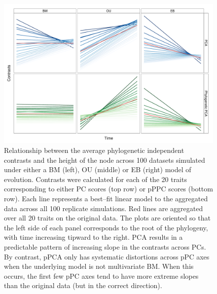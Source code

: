 \documentclass[a4paper,12pt]{article}
\begin{document}
\begin{figure}[p]
\centering
\includegraphics[scale=0.65]{./fig/nh-2panel.pdf}
\caption{Relationship between the average phylogenetic independent contrasts and the height of the node across 100 datasets simulated under either a BM (left), OU (middle) or EB (right) model of evolution. Contrasts were calculated for each of the 20 traits corresponding to either PC scores (top row) or pPPC scores (bottom row). Each line represents a best--fit linear model to the aggregated data across all 100 replicate simulations. Red lines are aggregated over all 20 traits on the original data. The plots are oriented so that the left side of each panel corresponds to the root of the phylogeny, with time increasing tipward to the right. PCA results in a predictable pattern of increasing slope in the contrasts across PCs. By contrast, pPCA only has systematic distortions across pPC axes when the underlying model is not multivariate BM. When this occurs, the first few pPC axes tend to have more extreme slopes than the original data (but in the correct direction).}
\label{nhplot}
\end{figure}
\end{document}
